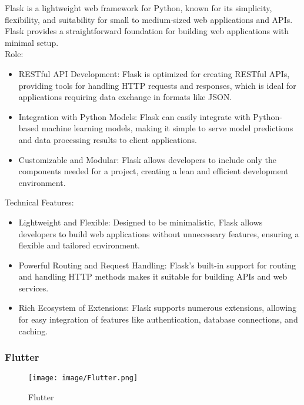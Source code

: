 \documentclass[conference]{IEEEtran}
\begin{document}
\noindent Flask is a lightweight web framework for Python, known for its simplicity, flexibility, and suitability for small to medium-sized web applications and APIs. Flask provides a straightforward foundation for building web applications with minimal setup.\\

Role:
\begin{itemize}
    \item RESTful API Development: Flask is optimized for creating RESTful APIs, providing tools for handling HTTP requests and responses, which is ideal for applications requiring data exchange in formats like JSON.\\
    \item Integration with Python Models: Flask can easily integrate with Python-based machine learning models, making it simple to serve model predictions and data processing results to client applications.\\
    \item Customizable and Modular: Flask allows developers to include only the components needed for a project, creating a lean and efficient development environment.\\
\end{itemize}

Technical Features:
\begin{itemize}
    \item Lightweight and Flexible: Designed to be minimalistic, Flask allows developers to build web applications without unnecessary features, ensuring a flexible and tailored environment.\\
    \item Powerful Routing and Request Handling: Flask’s built-in support for routing and handling HTTP methods makes it suitable for building APIs and web services.\\
    \item Rich Ecosystem of Extensions: Flask supports numerous extensions, allowing for easy integration of features like authentication, database connections, and caching.\\
\end{itemize}


\subsubsection{Flutter}

\begin{figure}[h!]
    \centering
    \texttt{[image: image/Flutter.png]}
    \caption{Flutter}
    \label{fig:enter-label}
\end{figure}
\end{document}
